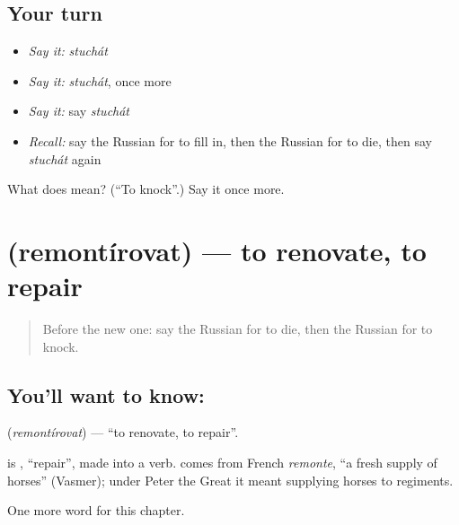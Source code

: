\subsection*{Your turn}
\begin{itemize}
\raggedright
  \item \emph{Say it:} \emph{stuchát}
  \item \emph{Say it:} \emph{stuchát}, once more
  \item \emph{Say it:} say \emph{stuchát}
  \item \emph{Recall:} say the Russian for to fill in, then the Russian for to die, then say \emph{stuchát} again
\end{itemize}

\begin{tcolorbox}[breakable,colback=teal!4,colframe=teal!35!black,title={Before you move on}]
What does  mean? (\textquotedblleft{}To knock\textquotedblright{}.) Say it once more.
\end{tcolorbox}
\section[\texorpdfstring{\ru{ремонтировать} (remontírovat)}{ремонтировать (remontírovat)}]{ (remontírovat) — to renovate, to repair}

\label{lesson:RU-C237-remontirovat}



\begin{quote}
Before the new one: say the Russian for to die, then the Russian for to knock.
\end{quote}

\subsection*{You'll want to know: }
\textbf{} (\emph{remontírovat}) — \textquotedblleft{}to renovate, to repair\textquotedblright{}.

\begin{cousinweb}
\textbf{} is \emph{}, \textquotedblleft{}repair\textquotedblright{}, made into a verb. \emph{} comes from French \emph{remonte}, \textquotedblleft{}a fresh supply of horses\textquotedblright{} (Vasmer); under Peter the Great it meant supplying horses to regiments.
\end{cousinweb}

\begin{grammarlens}[title={What you've built}]
One more word for this chapter.
\end{grammarlens}

